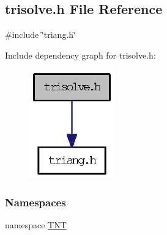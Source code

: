 \subsection{trisolve.h File Reference}
\label{trisolve_8h}
{\ttfamily \#include \char`\"{}triang.h\char`\"{}}\par
Include dependency graph for trisolve.h:
\nopagebreak
\begin{figure}[H]
\begin{center}
\leavevmode
\includegraphics[width=104pt]{trisolve_8h__incl}
\end{center}
\end{figure}
\subsubsection*{Namespaces}
\begin{DoxyCompactItemize}
\item 
namespace \hyperlink{namespace_t_n_t}{TNT}
\end{DoxyCompactItemize}
